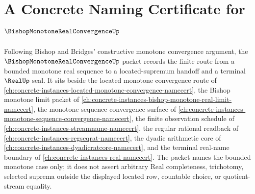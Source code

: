\chapter{A Concrete Naming Certificate for $\BishopMonotoneRealConvergenceUp$}
\label{ch:concrete-instances-bishop-monotone-real-convergence-namecert}

Following Bishop and Bridges' constructive monotone convergence argument, the $\BishopMonotoneRealConvergenceUp$ packet records the finite route from a bounded monotone real sequence to a located-supremum handoff and a terminal $\RealUp$ seal. It sits beside the located monotone convergence route of \autoref{ch:concrete-instances-located-monotone-convergence-namecert}, the Bishop monotone limit packet of \autoref{ch:concrete-instances-bishop-monotone-real-limit-namecert}, the monotone sequence convergence surface of \autoref{ch:concrete-instances-monotone-sequence-convergence-namecert}, the finite observation schedule of \autoref{ch:concrete-instances-streamname-namecert}, the regular rational readback of \autoref{ch:concrete-instances-regseqrat-namecert}, the dyadic arithmetic core of \autoref{ch:concrete-instances-dyadicratcore-namecert}, and the terminal real-name boundary of \autoref{ch:concrete-instances-real-namecert}. The packet names the bounded monotone case only; it does not assert arbitrary Real completeness, trichotomy, selected suprema outside the displayed located row, countable choice, or quotient-stream equality.

